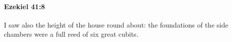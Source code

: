 
		\paragraph{Ezekiel 41:8} %
			\label{EZEKIEL-41-8}

			I saw also the height of the house round about: the foundations of the side chambers were a full reed of six great cubits.


